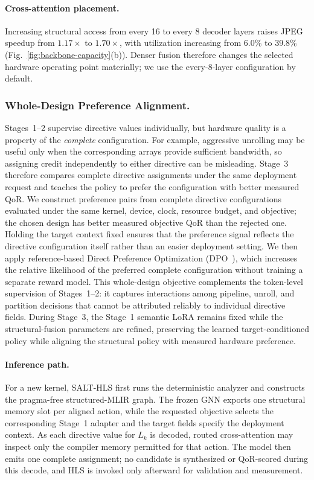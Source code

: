 \paragraph{Cross-attention placement.}
Increasing structural access from every 16 to every 8 decoder layers raises JPEG speedup from $1.17\times$ to $1.70\times$, with utilization increasing from 6.0\% to 39.8\% (Fig.~\ref{fig:backbone-capacity}(b)). Denser fusion therefore changes the selected hardware operating point materially; we use the every-8-layer configuration by default.


\subsubsection{Whole-Design Preference Alignment.}
Stages~1--2 supervise directive values individually, but hardware quality is a
property of the \emph{complete} configuration. For example, aggressive unrolling may be useful only when the corresponding arrays provide sufficient bandwidth, so assigning credit independently to either directive can be misleading. Stage~3 therefore compares complete directive assignments under the same deployment request and teaches the policy to prefer the configuration with better measured QoR.
We construct preference pairs from complete directive configurations evaluated under the same kernel, device, clock, resource budget, and objective; the chosen design has better measured objective QoR than the rejected one. Holding the target context fixed ensures that the preference signal reflects the directive configuration itself rather than an easier deployment setting. 
We then apply reference-based Direct Preference Optimization (DPO~\cite{rafailov2023dpo}), which increases the relative likelihood of the preferred complete configuration without training a separate reward model. This whole-design objective complements the token-level supervision of Stages~1--2: it captures interactions among pipeline, unroll, and partition decisions that cannot be attributed reliably to individual directive fields. During Stage~3, the Stage~1 semantic LoRA remains fixed while the structural-fusion parameters are refined, preserving the learned target-conditioned policy while aligning the structural policy with measured hardware preference.

\paragraph{Inference path.}
For a new kernel, SALT-HLS first runs the deterministic analyzer and constructs the pragma-free structured-MLIR graph. The frozen GNN exports one structural memory slot per aligned action, while the requested objective selects the corresponding Stage~1 adapter and the target fields specify the deployment context. As each directive value for $L_k$ is decoded, routed cross-attention may inspect only the compiler memory permitted for that action. The model then emits one complete assignment; no candidate is synthesized or QoR-scored during this decode, and HLS is invoked only afterward for validation and measurement.


